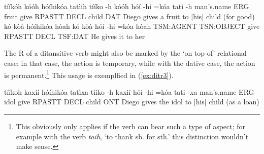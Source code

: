 \documentclass[a4paper, 12pt, oneside]{memoir}
\newcommand{\emh}[1]{\textit{#1}}
\begin{document}
\begin{examples}
    \ex \label{ex:ditr1}
    \words tííkóh kóóh hóíhikóa tatìih
    \bits tííko -h kóóh hóí -hi =kóa tati -h
    \gloss man's.name ERG fruit give RPASTT DECL child DAT
    \tr Diego gives a fruit to [his] child (for good)
    \ex \label{ex:ditr2}
    \words kó kòà hóíhikóa hòah
    \bits kó kòà hóí -hi =kóa hòah
    \gloss TSM:AGENT TSN:OBJECT give RPASTT DECL TSF:DAT
    \tr He gives it to her
\end{examples}
The R of a ditansitive verb might also be marked by the `on top of' relational case; in that case, the action is temporary, while with the dative case, the action is permanent.\footnote{This obviously only applies if the verb can bear such a type of aspect; for example  with the verb \emh{taih}, `to thank sb. for sth.' this distinction wouldn't make sense.} This  usage is exemplfied in (\ref{ex:ditr3}). 
\begin{examples}
    \ex \label{ex:ditr3}
    \words tííkoh kaxií hóíhikóa tatìxa
    \bits tííko -h kaxií hóí -hi =kóa tati -xa
    \gloss man's.name ERG idol give RPASTT DECL child ONT
    \tr Diego gives the idol to [his] child (as a loan)
\end{examples}
\end{document}
